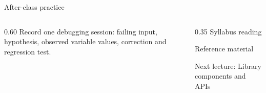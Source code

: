 \documentclass[10pt,aspectratio=169]{beamer}
\begin{document}
\begin{frame}[fragile,t]{After-class practice}
\begin{columns}[T,onlytextwidth]\begin{column}{0.60\textwidth}
Record one debugging session: failing input, hypothesis, observed variable values, correction and regression test.
\end{column}\begin{column}{0.35\textwidth}\small
Syllabus reading\par Reference material

Next lecture: Library components and APIs
\end{column}\end{columns}
\end{frame}
\end{document}
